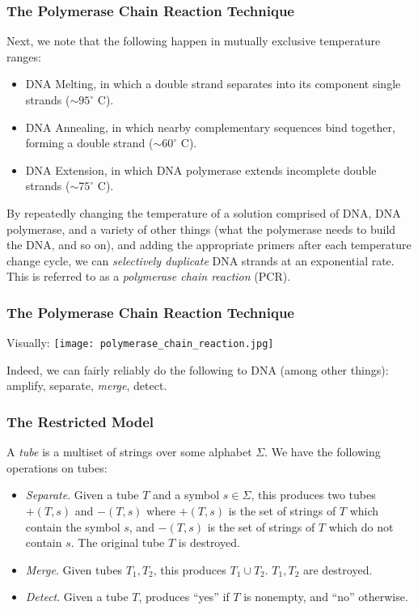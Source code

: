 \documentclass{beamer}
\begin{document}
\begin{frame}
\frametitle{The Polymerase Chain Reaction Technique}
Next, we note that the following happen in mutually exclusive temperature ranges:
\begin{itemize}
\item DNA Melting, in which a double strand separates into its component single strands ($\sim 95^\circ$ C).
\item DNA Annealing, in which nearby complementary sequences bind together, forming a double strand ($\sim 60^\circ$ C).
\item DNA Extension, in which DNA polymerase extends incomplete double strands ($\sim 75^\circ$ C).
\end{itemize}
By repeatedly changing the temperature of a solution comprised of DNA, DNA polymerase, and a variety of other things (what the polymerase needs to build the DNA, and so on), and adding the appropriate primers after each temperature change cycle, we can \emph{selectively duplicate} DNA strands at an exponential rate. This is referred to as a \emph{polymerase chain reaction} (PCR).
\end{frame}

\begin{frame}
\frametitle{The Polymerase Chain Reaction Technique}
Visually:
\texttt{[image: polymerase\_chain\_reaction.jpg]}
\end{frame}


\begin{frame}
Indeed, we can fairly reliably do the following to DNA (among other things):
amplify, separate, \emph{merge}, detect.
\end{frame}



\begin{frame}
\frametitle{The Restricted Model}
A \emph{tube} is a multiset of strings over some alphabet $\Sigma$. We have the following operations on tubes:
\begin{itemize}
\item \emph{Separate}. Given a tube $T$ and a symbol $s \in \Sigma$, this produces two tubes $+(T,s)$ and $-(T,s)$ where $+(T,s)$ is the set of strings of $T$ which contain the symbol $s$, and $-(T,s)$ is the set of strings of $T$ which do not contain $s$. The original tube $T$ is destroyed.
\item \emph{Merge}. Given tubes $T_1,T_2$, this produces $T_1 \cup T_2$. $T_1, T_2$ are destroyed.
\item \emph{Detect}. Given a tube $T$, produces ``yes'' if $T$ is nonempty, and ``no'' otherwise.
\end{itemize}
\end{frame}
\end{document}
